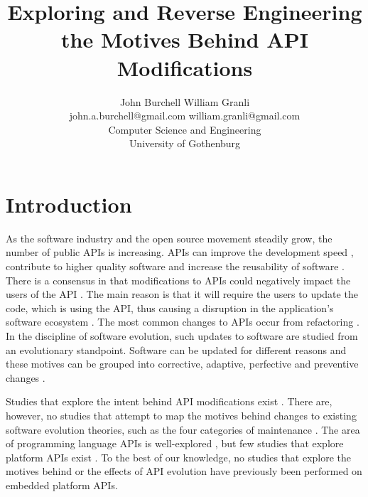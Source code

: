 \documentclass[10pt,twocolumn]{article}
\title{Exploring and Reverse Engineering the Motives Behind API Modifications}
\begin{document}


\author{John Burchell \qquad William Granli \\
		john.a.burchell@gmail.com \qquad william.granli@gmail.com \\
		Computer Science and Engineering  \\
		University of Gothenburg }


\maketitle





\section{Introduction}
As the software industry and the open source movement steadily grow, the number of public APIs is increasing. APIs can improve the development speed \cite{stylos2006comparing}, contribute to higher quality software \cite{stylos2006comparing} and increase the reusability of software \cite{afonso2012evaluating}. There is a consensus in that modifications to APIs could negatively impact the users of the API \cite{google_talk} \cite{mcdonnell2013empirical} \cite{robbes2012developers} \cite{henning2007api}. The main reason is that it will require the users to update the code, which is using the API, thus causing a disruption in the application's software ecosystem \cite{messerschmitt2005software}. The most common changes to APIs occur from refactoring \cite{dig2005role} \cite{xing2006refactoring}. 
In the discipline of software evolution, such updates to software are studied from an evolutionary standpoint. Software can be updated for different reasons and these motives can be grouped into corrective, adaptive, perfective and preventive changes \cite{lientz1980software}. 

Studies that explore the intent behind API modifications exist \cite{hou2011exploring}. There are, however, no studies that attempt to map the motives behind changes to existing software evolution theories, such as the four categories of maintenance \cite{lientz1980software}. The area of programming language APIs is well-explored \cite{hou2011exploring} \cite{shi2011empirical}, but few studies that explore platform APIs exist \cite{robbes2012developers}. To the best of our knowledge, no studies that explore the motives behind or the effects of API evolution have previously been performed on embedded platform APIs. 
\end{document}

